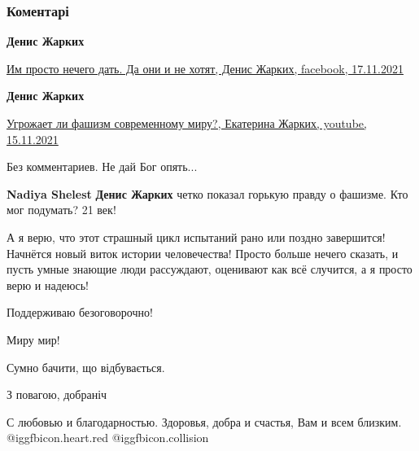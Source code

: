  
 
 
 
 
\subsubsection{Коментарі}
\label{sec:19_11_2021.fb.titarenko_lubov.1.ja_ne_sudja.cmt}

\begin{itemize} %
\textbf{Денис Жарких}

\href{https://www.facebook.com/100006102787780/posts/3124249571121772/}{%
Им просто нечего дать. Да они и не хотят, Денис Жарких, facebook, 17.11.2021%
}

\textbf{Денис Жарких}

\href{https://www.youtube.com/watch?app=desktop&v=dojoAovL-6M}{%
Угрожает ли фашизм современному миру?, Екатерина Жарких, youtube, 15.11.2021%
}

\begin{itemize} %
Без комментариев. Не дай Бог опять...

\textbf{Nadiya Shelest}
\textbf{Денис Жарких} четко показал горькую правду о фашизме. Кто мог подумать? 21 век!
\end{itemize} %

А я верю, что этот страшный цикл испытаний рано или поздно завершится!
Начнётся новый виток истории человечества!
Просто больше нечего сказать, и пусть умные знающие люди рассуждают, оценивают как всё случится, а я просто верю и надеюсь!


Поддерживаю безоговорочно!

Миру мир!

Сумно бачити, що відбувається.

З повагою, добраніч

С любовью и благодарностью.
Здоровья, добра и счастья, Вам и всем близким. @igg{fbicon.heart.red} @igg{fbicon.collision} 

\end{itemize} %
